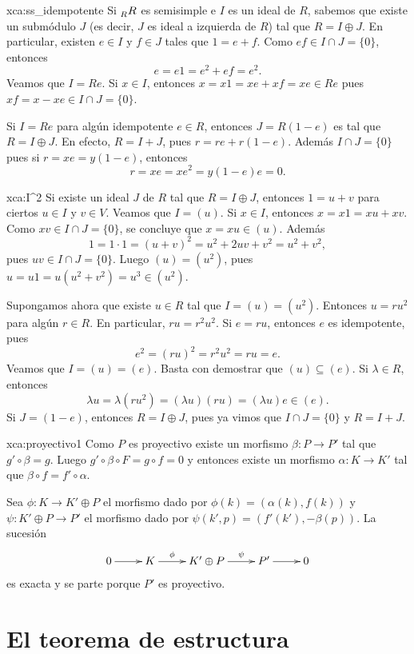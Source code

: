 \begin{sol}{xca:ss_idempotente}
Si $\prescript{}{R}R$ es semisimple e $I$ es un ideal de $R$, sabemos que existe un submódulo $J$ (es decir, $J$ es ideal a izquierda de $R$) tal que $R=I\oplus J$. En particular, 
existen $e\in I$ y $f\in J$ tales que $1=e+f$. Como $ef\in I\cap J=\{0\}$, entonces
\[
e=e1=e^2+ef=e^2.
\]
Veamos que $I=Re$. Si $x\in I$, entonces $x=x1=xe+xf=xe\in Re$ pues $xf=x-xe\in I\cap J=\{0\}$. 

Si $I=Re$ para algún idempotente $e\in R$, entonces $J=R(1-e)$ es tal que $R=I\oplus J$. En efecto, $R=I+J$, pues 
$r=re+r(1-e)$. Además $I\cap J=\{0\}$ pues si $r=xe=y(1-e)$, entonces 
\[
r=xe=xe^2=y(1-e)e=0.
\]
\end{sol}

\begin{sol}{xca:I^2}
Si existe un ideal $J$ de $R$ tal que $R=I\oplus J$, entonces $1=u+v$ para ciertos $u\in I$ y $v\in V$. Veamos que $I=(u)$. Si $x\in I$,
entonces $x=x1=xu+xv$. Como $xv\in I\cap J=\{0\}$, se concluye que $x=xu\in (u)$. Además 
\[
1=1\cdot 1=(u+v)^2=u^2+2uv+v^2=u^2+v^2,
\]
pues $uv\in I\cap J=\{0\}$. Luego $(u)=(u^2)$, pues $u=u1=u(u^2+v^2)=u^3\in (u^2)$.  

Supongamos ahora que existe $u\in R$ tal que $I=(u)=(u^2)$. Entonces $u=ru^2$ para algún $r\in R$. En particular, 
$ru=r^2u^2$. Si  
$e=ru$, entonces $e$ es idempotente, pues
\[
e^2=(ru)^2=r^2u^2=ru=e.
\]
Veamos que $I=(u)=(e)$. Basta con demostrar que $(u)\subseteq (e)$. 
Si $\lambda\in R$, entonces 
\[
\lambda u=\lambda(ru^2)=(\lambda u)(ru)=(\lambda u)e\in (e).
\]
Si $J=(1-e)$, entonces $R=I\oplus J$, pues ya vimos que
$I\cap J=\{0\}$ y $R=I+J$.  	
\end{sol}

\begin{sol}{xca:proyectivo1}
	Como $P$ es proyectivo existe un morfismo $\beta\colon P\to P'$ tal que $g'\circ \beta=g$.
	Luego $g'\circ \beta\circ F=g\circ f=0$ y entonces existe un morfismo $\alpha\colon K\to K'$
	tal que $\beta\circ f=f'\circ \alpha$. 

	Sea $\phi\colon K\to K'\oplus P$ el morfismo dado por
	$\phi(k)=(\alpha(k),f(k))$ y $\psi\colon K'\oplus P\to P'$ el morfismo dado
	por $\psi(k',p)=(f'(k'),-\beta(p))$. 
	La sucesión 
	\[
	\xymatrix{
	0\ar[r] 
	& K
	\ar[r]^-{\phi}
	& K'\oplus P
	\ar[r]^-{\psi}
	& P'\ar[r]
	& 0
	}
	\]
	es exacta y se parte porque $P'$ es proyectivo.
\end{sol}

\section*{El teorema de estructura}

